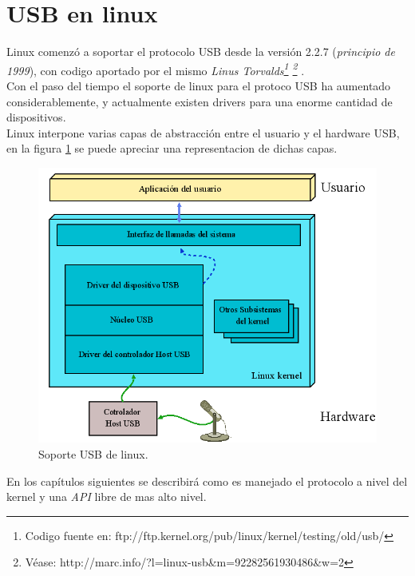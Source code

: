 \section{USB en linux}

Linux comenz\'o a soportar el protocolo USB desde la versi\'on 2.2.7
(\emph{principio de 1999}), con codigo aportado por el mismo \emph{Linus
Torvalds\footnote{Codigo fuente
en: ftp://ftp.kernel.org/pub/linux/kernel/testing/old/usb/}
\footnote{V\'ease:
http://marc.info/?l=linux-usb\&m=92282561930486\&w=2}
}.\\

Con el paso del tiempo el soporte de linux para el protoco USB ha aumentado
considerablemente, y actualmente existen drivers para una enorme cantidad de
dispositivos.\\

Linux interpone varias capas de abstracci\'on entre el usuario y el hardware
USB, en la figura \ref{fig:usb_linux_layers} se puede apreciar una
representacion de dichas capas.

\begin{figure}
\centering
\includegraphics[scale=0.5]{./img/usb_linux_layers.png}
\caption{Soporte USB de linux.}
\label{fig:usb_linux_layers}
\end{figure}


En los cap\'itulos siguientes se describir\'a como es manejado el protocolo a
nivel del kernel y una \emph{API} libre de mas alto nivel.


